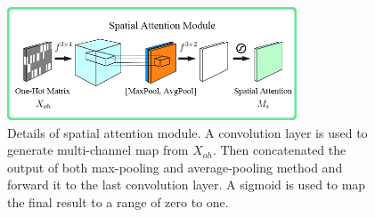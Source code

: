 \documentclass{bioinfo}
\begin{document}
\begin{figure}[!tpb]%
    \centerline{\includegraphics[width=86mm]{spatialmodule.png}}
    \caption{Details of spatial attention module. A convolution layer is used to generate multi-channel map from $X_{oh}$.
    Then concatenated the output of both max-pooling and average-pooling method and forward it to the last convolution layer.
    A sigmoid is used to map the final result to a range of zero to one.
    }\label{fig:03}
\end{figure}
\end{document}
